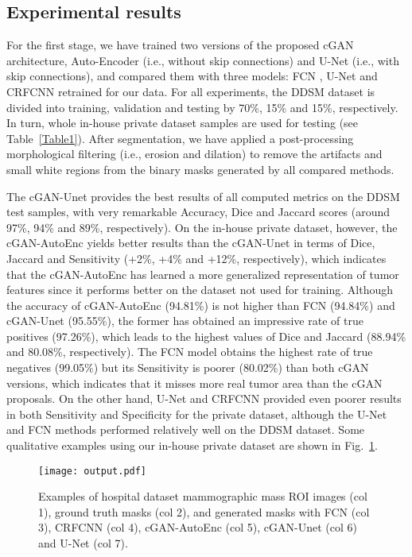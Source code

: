 \documentclass[runningheads,a4paper]{llncs}
\begin{document}
\subsection{Experimental results}
For the first stage, we have trained two versions of the proposed cGAN architecture, Auto-Encoder (i.e., without skip connections) and U-Net (i.e., with skip connections), and compared them with three models: FCN \cite{long2015fully}, U-Net \cite{ronneberger2015u} and CRFCNN \cite{dhungel2015deep} retrained for our data. For all experiments, the DDSM dataset is divided into training, validation and testing by 70\%, 15\% and 15\%, respectively. In turn, whole in-house private dataset samples are used for testing (see Table~\ref{Table1}). After segmentation, we have applied a post-processing morphological filtering (i.e., erosion and dilation) to remove the artifacts and small white regions from the binary masks generated by all compared methods.

The cGAN-Unet provides the best results of all computed metrics on the DDSM test samples, with very remarkable Accuracy, Dice and Jaccard scores (around 97\%, 94\% and 89\%, respectively). On the in-house private dataset, however, the cGAN-AutoEnc yields better results than the cGAN-Unet in terms of Dice, Jaccard and Sensitivity (+2\%, +4\% and +12\%, respectively), which indicates that the cGAN-AutoEnc has learned a more generalized representation of tumor features since it performs better on the dataset not used for training. Although the accuracy of cGAN-AutoEnc (94.81\%) is not higher than FCN (94.84\%) and cGAN-Unet (95.55\%), the former has obtained an impressive rate of true positives (97.26\%), which leads to the highest values of Dice and Jaccard (88.94\% and 80.08\%, respectively). The FCN model obtains the highest rate of true negatives (99.05\%) but its Sensitivity is poorer (80.02\%) than both cGAN versions, which indicates that it misses more real tumor area than the cGAN proposals. On the other hand, U-Net and CRFCNN provided even poorer results in both Sensitivity and Specificity for the private dataset, although the U-Net and FCN methods performed relatively well on the DDSM dataset. Some qualitative examples using our in-house private dataset are shown in Fig.~\ref{fig5:Segmentation}.

\vspace*{-3mm}
\begin{figure}[!h]
	\centering
	\texttt{[image: output.pdf]}
	\caption{ Examples of hospital dataset mammographic mass ROI images (col 1), ground truth masks (col 2), and generated masks with FCN (col 3), CRFCNN (col 4), cGAN-AutoEnc (col 5), cGAN-Unet (col 6) and U-Net (col 7).}
	\label{fig5:Segmentation}
\end{figure}
\end{document}

